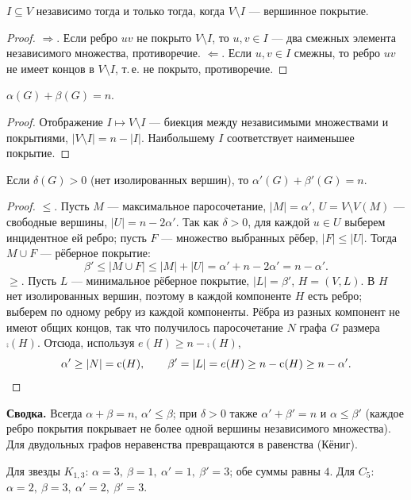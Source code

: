 \begin{lemma}
\(I\subseteq V\) независимо тогда и только тогда, когда \(V\setminus I\) —
вершинное покрытие.
\end{lemma}
\begin{proof}
\(\Rightarrow\). Если ребро \(uv\) не покрыто \(V\setminus I\), то \(u,v\in I\) —
два смежных элемента независимого множества, противоречие.
\(\Leftarrow\). Если \(u,v\in I\) смежны, то ребро \(uv\) не имеет концов в
\(V\setminus I\), т.\,е. не покрыто, противоречие.
\end{proof}
\begin{cor}
\(\alpha(G)+\beta(G)=n\).
\end{cor}
\begin{proof}
Отображение \(I\mapsto V\setminus I\) — биекция между независимыми множествами
и покрытиями, \(|V\setminus I|=n-|I|\). Наибольшему \(I\) соответствует
наименьшее покрытие.
\end{proof}


\begin{theorem}[Галлаи, 1959]
Если \(\delta(G)>0\) (нет изолированных вершин), то \(\alpha'(G)+\beta'(G)=n\).
\end{theorem}
\begin{proof}
\(\le\). Пусть \(M\) — максимальное паросочетание, \(|M|=\alpha'\), \(U=V\setminus V(M)\)
— свободные вершины, \(|U|=n-2\alpha'\). Так как \(\delta>0\), для каждой
\(u\in U\) выберем инцидентное ей ребро; пусть \(F\) — множество выбранных рёбер,
\(|F|\le|U|\). Тогда \(M\cup F\) — рёберное покрытие:
\[
\beta'\le|M\cup F|\le|M|+|U|=\alpha'+n-2\alpha'=n-\alpha'.
\]
\(\ge\). Пусть \(L\) — минимальное рёберное покрытие, \(|L|=\beta'\),
\(H=(V,L)\). В \(H\) нет изолированных вершин, поэтому в каждой компоненте
\(H\) есть ребро; выберем по одному ребру из каждой компоненты. Рёбра из разных
компонент не имеют общих концов, так что получилось паросочетание \(N\) графа
\(G\) размера \(\comp(H)\). Отсюда, используя \(e(H)\ge n-\comp(H)\),
\[
\alpha'\ge|N|=\operatorname{c}(H),\qquad \beta'=|L|=e(H)\ge n-\operatorname{c}(H)\ge n-\alpha'.\qedhere
\]
\end{proof}

\begin{tcolorbox}[colback=cbGrayBack,colframe=cbGray!55]
\textbf{Сводка.} Всегда \(\alpha+\beta=n\), \(\alpha'\le\beta\);
при \(\delta>0\) также \(\alpha'+\beta'=n\) и \(\alpha\le\beta'\)
(каждое ребро покрытия покрывает не более одной вершины независимого множества).
Для двудольных графов неравенства превращаются в равенства (Кёниг).
\end{tcolorbox}
\begin{example}
Для звезды \(K_{1,3}\): \(\alpha=3,\ \beta=1,\ \alpha'=1,\ \beta'=3\); обе суммы равны \(4\).
Для \(C_5\): \(\alpha=2,\ \beta=3,\ \alpha'=2,\ \beta'=3\).
\end{example}
